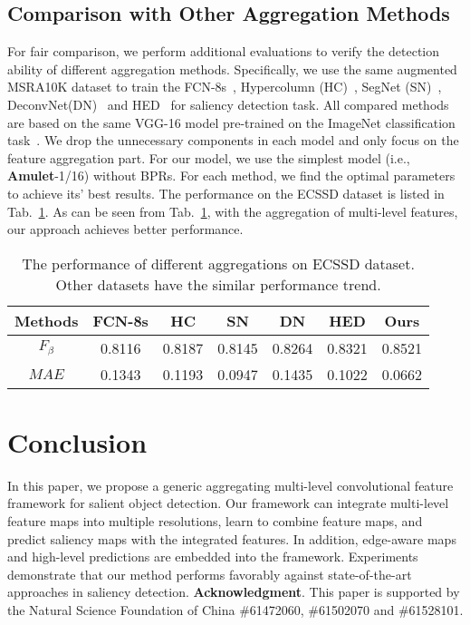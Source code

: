 \documentclass[10pt,twocolumn,letterpaper]{article}
\begin{document}
\subsection{Comparison with Other Aggregation Methods}
For fair comparison, we perform additional evaluations to verify the detection ability of different aggregation methods.
Specifically, we use the same augmented MSRA10K dataset to train the FCN-8s~\cite{long2015fully}, Hypercolumn (HC)~\cite{hariharan2015hypercolumns}, SegNet (SN)~\cite{segnet}, DeconvNet(DN)~\cite{noh2015learning} and HED~\cite{xie2015holistically} for saliency detection task.
All compared methods are based on the same VGG-16 model pre-trained on the ImageNet classification task~\cite{simonyan2014very}.
We drop the unnecessary components in each model and only focus on the feature aggregation part.
For our model, we use the simplest model (i.e., \textbf{Amulet}-1/16) without BPRs.
For each method, we find the optimal parameters to achieve its' best results.
The performance on the ECSSD dataset is listed in Tab.~\ref{table:aggregation}. As can be seen from Tab.~\ref{table:aggregation}, with the aggregation of multi-level features, our approach achieves better performance.
\begin{table}
\begin{center}
\begin{tabular}{|c|c|c|c|c|c|c|}
\hline
Methods &\textbf{FCN-8s}&\textbf{HC}&\textbf{SN}&\textbf{DN}&\textbf{HED}&\textbf{Ours}\\
\hline
$F_\beta$&0.8116&0.8187& 0.8145 & 0.8264 &0.8321&0.8521        \\
\hline
$MAE$    &0.1343&0.1193& 0.0947& 0.1435& 0.1022&0.0662       \\
\hline
\end{tabular}
\end{center}
\vspace{-3mm}
\caption{The performance of different aggregations on ECSSD dataset. Other datasets have the similar performance trend.}
\label{table:aggregation}
\vspace{-6mm}
\end{table}
\section{Conclusion}

In this paper, we propose a generic aggregating multi-level convolutional feature framework for salient object detection.
Our framework can integrate multi-level feature maps into multiple resolutions, learn to combine feature maps, and predict saliency maps with the integrated features.
In addition, edge-aware maps and high-level predictions are embedded into the framework.
Experiments demonstrate that our method performs favorably against state-of-the-art approaches in saliency detection.
\vspace{-2mm}
{\small {\flushleft\textbf{Acknowledgment}}.
This paper is supported by the Natural Science Foundation of China \#61472060, \#61502070 and \#61528101.}
\vspace{-5mm}
{\small


}
\end{document}
